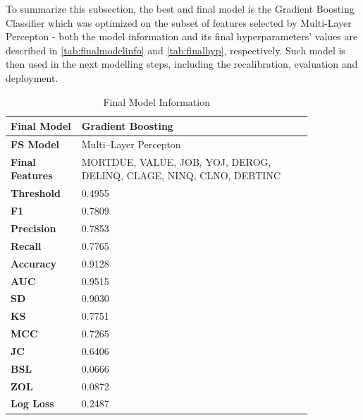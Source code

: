         To summarize this subsection, the best and final model is the Gradient Boosting Classifier which was optimized on the subset of features selected by Multi-Layer Percepton - both the model information and its final hyperparameters' values are described in \autoref{tab:finalmodelinfo} and \autoref{tab:finalhyp}, respectively. Such model is then used in the next modelling steps, including the recalibration, evaluation and deployment.
        \begin{table}[H]
            \small
            \setlength{\tabcolsep}{8pt}
            \renewcommand{\arraystretch}{1.3}
            \centering
            \caption{Final Model Information}\label{tab:finalmodelinfo}
            \begin{tabular}{p{0.20\linewidth}|p{0.65\linewidth}}
            \toprule
            \midrule
            \textbf{Final Model} & Gradient Boosting \\
            \midrule
            \textbf{FS Model} & Multi--Layer Percepton \\
            \midrule
            \textbf{Final Features} &
            MORTDUE, VALUE, JOB, YOJ, DEROG, DELINQ, CLAGE, NINQ, CLNO, DEBTINC \\
            \midrule
            \textbf{Threshold} & 0.4955 \\
            \midrule
            \textbf{F1} & 0.7809 \\
            \midrule
            \textbf{Precision} & 0.7853 \\
            \midrule
            \textbf{Recall} &  0.7765 \\
            \midrule
            \textbf{Accuracy} & 0.9128 \\
            \midrule
            \textbf{AUC} & 0.9515 \\
            \midrule
            \textbf{SD} & 0.9030 \\
            \midrule
            \textbf{KS} & 0.7751 \\
            \midrule
            \textbf{MCC} & 0.7265 \\
            \midrule
            \textbf{JC} & 0.6406 \\
            \midrule
            \textbf{BSL} & 0.0666 \\
            \midrule
            \textbf{ZOL} & 0.0872 \\
            \midrule
            \textbf{Log Loss} & 0.2487 \\
            \midrule
            \bottomrule
            \end{tabular}
            \vspace{0.5em}
        
            \vspace{-0.5em}
            \end{table}
        
